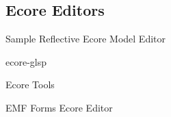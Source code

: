 \subsection{Ecore Editors}

Sample Reflective Ecore Model Editor %

ecore-glsp %

Ecore Tools %

EMF Forms Ecore Editor %

